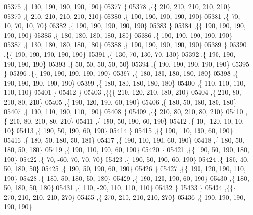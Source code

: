 \begin{DoxyCode}
05376     ,\{   190,   190,   190,   190,   190\}
05377     \}
05378    ,\{\{   210,   210,   210,   210,   210\}
05379     ,\{   210,   210,   210,   210,   210\}
05380     ,\{   190,   190,   190,   190,   190\}
05381     ,\{    70,    10,    70,    10,    70\}
05382     ,\{   190,   190,   190,   190,   190\}
05383     \}
05384    ,\{\{   190,   190,   190,   190,   190\}
05385     ,\{   180,   180,   180,   180,   180\}
05386     ,\{   190,   190,   190,   190,   190\}
05387     ,\{   180,   180,   180,   180,   180\}
05388     ,\{   190,   190,   190,   190,   190\}
05389     \}
05390    ,\{\{   190,   190,   190,   190,   190\}
05391     ,\{   130,    70,   130,    70,   130\}
05392     ,\{   190,   190,   190,   190,   190\}
05393     ,\{    50,    50,    50,    50,    50\}
05394     ,\{   190,   190,   190,   190,   190\}
05395     \}
05396    ,\{\{   190,   190,   190,   190,   190\}
05397     ,\{   180,   180,   180,   180,   180\}
05398     ,\{   190,   190,   190,   190,   190\}
05399     ,\{   180,   180,   180,   180,   180\}
05400     ,\{   110,   110,   110,   110,   110\}
05401     \}
05402    \}
05403   ,\{\{\{   210,   120,   210,   180,   210\}
05404     ,\{   210,    80,   210,    80,   210\}
05405     ,\{   190,   120,   190,    60,   190\}
05406     ,\{   180,    50,   180,   180,   180\}
05407     ,\{   190,   110,   190,   110,   190\}
05408     \}
05409    ,\{\{   210,    80,   210,    80,   210\}
05410     ,\{   210,    80,   210,    80,   210\}
05411     ,\{   190,    50,   190,    60,   190\}
05412     ,\{    10,  -120,    10,    10,    10\}
05413     ,\{   190,    50,   190,    60,   190\}
05414     \}
05415    ,\{\{   190,   110,   190,    60,   190\}
05416     ,\{   180,    50,   180,    50,   180\}
05417     ,\{   190,   110,   190,    60,   190\}
05418     ,\{   180,    50,   180,    50,   180\}
05419     ,\{   190,   110,   190,    60,   190\}
05420     \}
05421    ,\{\{   190,    50,   190,   180,   190\}
05422     ,\{    70,   -60,    70,    70,    70\}
05423     ,\{   190,    50,   190,    60,   190\}
05424     ,\{   180,    40,    50,   180,    50\}
05425     ,\{   190,    50,   190,    60,   190\}
05426     \}
05427    ,\{\{   190,   120,   190,   110,   190\}
05428     ,\{   180,    50,   180,    50,   180\}
05429     ,\{   190,   120,   190,    60,   190\}
05430     ,\{   180,    50,   180,    50,   180\}
05431     ,\{   110,   -20,   110,   110,   110\}
05432     \}
05433    \}
05434   ,\{\{\{   270,   210,   210,   210,   270\}
05435     ,\{   270,   210,   210,   210,   270\}
05436     ,\{   190,   190,   190,   190,   190\}

\end{DoxyCode}

